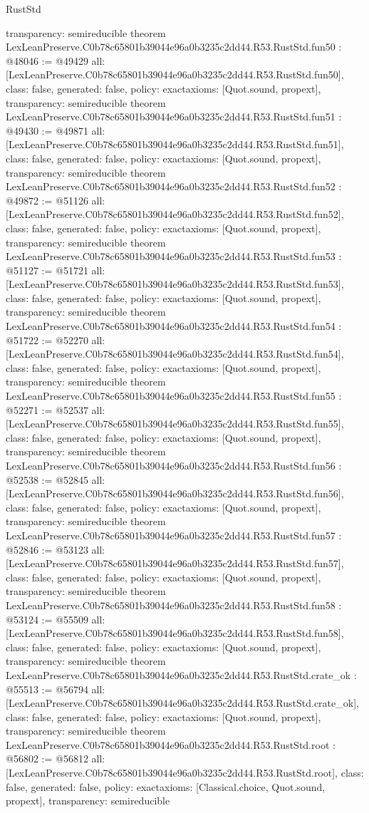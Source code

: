 \begin{lexlean}{RustStd}
\begin{coremodule}
{  transparency: semireducible
}
theorem LexLeanPreserve.C0b78c65801b39044e96a0b3235c2dd44.R53.RustStd.fun50 : @48046 := @49429 {
  all: [LexLeanPreserve.C0b78c65801b39044e96a0b3235c2dd44.R53.RustStd.fun50],
  class: false,
  generated: false,
  policy: exact{axioms: [Quot.sound, propext]},
  transparency: semireducible
}
theorem LexLeanPreserve.C0b78c65801b39044e96a0b3235c2dd44.R53.RustStd.fun51 : @49430 := @49871 {
  all: [LexLeanPreserve.C0b78c65801b39044e96a0b3235c2dd44.R53.RustStd.fun51],
  class: false,
  generated: false,
  policy: exact{axioms: [Quot.sound, propext]},
  transparency: semireducible
}
theorem LexLeanPreserve.C0b78c65801b39044e96a0b3235c2dd44.R53.RustStd.fun52 : @49872 := @51126 {
  all: [LexLeanPreserve.C0b78c65801b39044e96a0b3235c2dd44.R53.RustStd.fun52],
  class: false,
  generated: false,
  policy: exact{axioms: [Quot.sound, propext]},
  transparency: semireducible
}
theorem LexLeanPreserve.C0b78c65801b39044e96a0b3235c2dd44.R53.RustStd.fun53 : @51127 := @51721 {
  all: [LexLeanPreserve.C0b78c65801b39044e96a0b3235c2dd44.R53.RustStd.fun53],
  class: false,
  generated: false,
  policy: exact{axioms: [Quot.sound, propext]},
  transparency: semireducible
}
theorem LexLeanPreserve.C0b78c65801b39044e96a0b3235c2dd44.R53.RustStd.fun54 : @51722 := @52270 {
  all: [LexLeanPreserve.C0b78c65801b39044e96a0b3235c2dd44.R53.RustStd.fun54],
  class: false,
  generated: false,
  policy: exact{axioms: [Quot.sound, propext]},
  transparency: semireducible
}
theorem LexLeanPreserve.C0b78c65801b39044e96a0b3235c2dd44.R53.RustStd.fun55 : @52271 := @52537 {
  all: [LexLeanPreserve.C0b78c65801b39044e96a0b3235c2dd44.R53.RustStd.fun55],
  class: false,
  generated: false,
  policy: exact{axioms: [Quot.sound, propext]},
  transparency: semireducible
}
theorem LexLeanPreserve.C0b78c65801b39044e96a0b3235c2dd44.R53.RustStd.fun56 : @52538 := @52845 {
  all: [LexLeanPreserve.C0b78c65801b39044e96a0b3235c2dd44.R53.RustStd.fun56],
  class: false,
  generated: false,
  policy: exact{axioms: [Quot.sound, propext]},
  transparency: semireducible
}
theorem LexLeanPreserve.C0b78c65801b39044e96a0b3235c2dd44.R53.RustStd.fun57 : @52846 := @53123 {
  all: [LexLeanPreserve.C0b78c65801b39044e96a0b3235c2dd44.R53.RustStd.fun57],
  class: false,
  generated: false,
  policy: exact{axioms: [Quot.sound, propext]},
  transparency: semireducible
}
theorem LexLeanPreserve.C0b78c65801b39044e96a0b3235c2dd44.R53.RustStd.fun58 : @53124 := @55509 {
  all: [LexLeanPreserve.C0b78c65801b39044e96a0b3235c2dd44.R53.RustStd.fun58],
  class: false,
  generated: false,
  policy: exact{axioms: [Quot.sound, propext]},
  transparency: semireducible
}
theorem LexLeanPreserve.C0b78c65801b39044e96a0b3235c2dd44.R53.RustStd.crate_ok : @55513 := @56794 {
  all: [LexLeanPreserve.C0b78c65801b39044e96a0b3235c2dd44.R53.RustStd.crate_ok],
  class: false,
  generated: false,
  policy: exact{axioms: [Quot.sound, propext]},
  transparency: semireducible
}
theorem LexLeanPreserve.C0b78c65801b39044e96a0b3235c2dd44.R53.RustStd.root : @56802 := @56812 {
  all: [LexLeanPreserve.C0b78c65801b39044e96a0b3235c2dd44.R53.RustStd.root],
  class: false,
  generated: false,
  policy: exact{axioms: [Classical.choice, Quot.sound, propext]},
  transparency: semireducible
}


\end{coremodule}
\end{lexlean}
